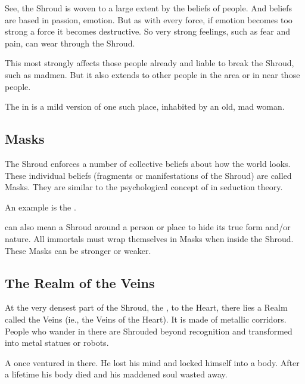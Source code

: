 See, the Shroud is woven to a large extent by the beliefs of people. And beliefs are based in passion, emotion. But as with every force, if emotion becomes too strong a force it becomes destructive. So very strong feelings, such as fear and pain, can wear through the Shroud. 

This  most strongly affects those people already  and liable to break the Shroud, such as madmen. But it also extends to other people in the area or in near those people. 

The  in \Malcur is a mild version of one such place, inhabited by an old, mad woman.  









\subsection{Masks}
The Shroud enforces a number of collective beliefs about how the world looks. 
These individual beliefs (fragments or manifestations of the Shroud) are called Masks. 
They are similar to the psychological concept of  in seduction theory. 

An example is the . 

 can also mean a Shroud around a person or place to hide its true form and/or nature. 
All immortals must wrap themselves in Masks when \travelling inside the Shroud. 
These Masks can be stronger or weaker. 









\subsection{The Realm of the Veins}
At the very densest part of the Shroud, the ,  to the Heart, there lies a Realm called the Veins (ie., the Veins of the Heart). 
It is made of metallic corridors. 
People who wander in there are Shrouded beyond recognition and transformed into metal statues or robots. 

A \resphan{} once ventured in there. 
He lost his mind and locked himself into a \human{} body. 
After a \human{} lifetime his body died and his maddened soul wasted away. 









